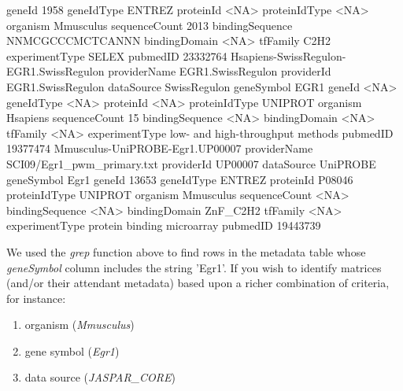 \documentclass{article}
\renewenvironment{Schunk}{\vspace{\topsep}}{\vspace{\topsep}}
\begin{document}
\begin{Schunk}
\begin{Soutput}
geneId          1958                    
geneIdType      ENTREZ                  
proteinId       <NA>                    
proteinIdType   <NA>                    
organism        Mmusculus               
sequenceCount   2013                    
bindingSequence NNMCGCCCMCTCANNN        
bindingDomain   <NA>                    
tfFamily        C2H2                    
experimentType  SELEX                   
pubmedID        23332764                
                Hsapiens-SwissRegulon-EGR1.SwissRegulon
providerName    EGR1.SwissRegulon                      
providerId      EGR1.SwissRegulon                      
dataSource      SwissRegulon                           
geneSymbol      EGR1                                   
geneId          <NA>                                   
geneIdType      <NA>                                   
proteinId       <NA>                                   
proteinIdType   UNIPROT                                
organism        Hsapiens                               
sequenceCount   15                                     
bindingSequence <NA>                                   
bindingDomain   <NA>                                   
tfFamily        <NA>                                   
experimentType  low- and high-throughput methods       
pubmedID        19377474                               
                Mmusculus-UniPROBE-Egr1.UP00007
providerName    SCI09/Egr1_pwm_primary.txt     
providerId      UP00007                        
dataSource      UniPROBE                       
geneSymbol      Egr1                           
geneId          13653                          
geneIdType      ENTREZ                         
proteinId       P08046                         
proteinIdType   UNIPROT                        
organism        Mmusculus                      
sequenceCount   <NA>                           
bindingSequence <NA>                           
bindingDomain   ZnF_C2H2                       
tfFamily        <NA>                           
experimentType  protein binding microarray     
pubmedID        19443739                       
\end{Soutput}
\end{Schunk}

We used the \emph{grep} function above to find rows in the metadata table whose \emph{geneSymbol} column includes the string 'Egr1'.
If you wish to identify matrices (and/or their attendant metadata) based upon a richer combination of criteria, for instance:

\begin{enumerate}
  \item organism  (\emph{Mmusculus})
  \item gene symbol  (\emph{Egr1})
  \item data source  (\emph{JASPAR\_CORE})
\end{enumerate}
\end{document}
